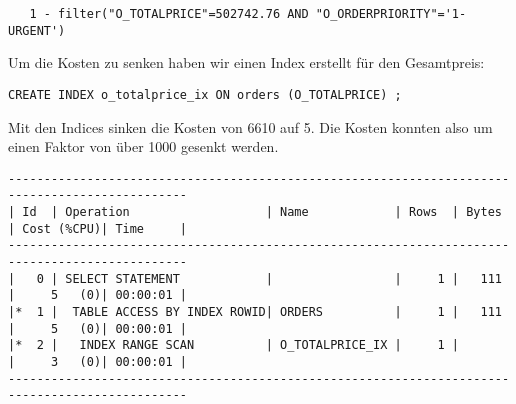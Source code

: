 \documentclass[11pt,a4paper,parskip=half]{scrartcl}
\begin{document}
\begin{lstlisting}
   1 - filter("O_TOTALPRICE"=502742.76 AND "O_ORDERPRIORITY"='1-URGENT')                                                                                                                                                                                                                                     
\end{lstlisting}

Um die Kosten zu senken haben wir einen Index erstellt für den Gesamtpreis:
\begin{lstlisting}
CREATE INDEX o_totalprice_ix ON orders (O_TOTALPRICE) ;
\end{lstlisting}

Mit den Indices sinken die Kosten von 6610 auf 5. Die Kosten konnten also um einen Faktor von über 1000 gesenkt werden.
\begin{lstlisting}
-----------------------------------------------------------------------------------------------                                                                                                                                                                                                              
| Id  | Operation                   | Name            | Rows  | Bytes | Cost (%CPU)| Time     |                                                                                                                                                                                                              
-----------------------------------------------------------------------------------------------                                                                                                                                                                                                              
|   0 | SELECT STATEMENT            |                 |     1 |   111 |     5   (0)| 00:00:01 |                                                                                                                                                                                                              
|*  1 |  TABLE ACCESS BY INDEX ROWID| ORDERS          |     1 |   111 |     5   (0)| 00:00:01 |                                                                                                                                                                                                              
|*  2 |   INDEX RANGE SCAN          | O_TOTALPRICE_IX |     1 |       |     3   (0)| 00:00:01 |                                                                                                                                                                                                              
-----------------------------------------------------------------------------------------------                                                                                                                                                                                                              
                                                                                                                                                                                                                                                                                                             

\end{lstlisting}
\end{document}
